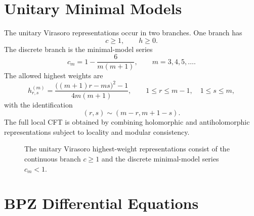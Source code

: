 \section{Unitary Minimal Models}

The unitary Virasoro representations occur in two branches.  One branch has
\[
  c\ge1,
  \qquad
  h\ge0.
\]
The discrete branch is the minimal-model series
\begin{equation}
  c_m=1-\frac{6}{m(m+1)},
  \qquad
  m=3,4,5,\ldots .
  \label{eq:unitary-minimal-central-charge}
\end{equation}
The allowed highest weights are
\begin{equation}
  h_{r,s}^{(m)}
  =
  \frac{\bigl((m+1)r-ms\bigr)^2-1}{4m(m+1)},
  \qquad
  1\le r\le m-1,
  \quad
  1\le s\le m,
  \label{eq:kac-weights-unitary-minimal}
\end{equation}
with the identification
\[
  (r,s)\sim(m-r,m+1-s).
\]
The full local CFT is obtained by combining holomorphic and antiholomorphic
representations subject to locality and modular consistency.

\begin{figure}[H]
  \centering
  \caption{The unitary Virasoro highest-weight representations consist of the
  continuous branch \(c\ge1\) and the discrete minimal-model series
  \(c_m<1\).}
  \label{fig:virasoro-unitarity-branches}
\end{figure}

\section{BPZ Differential Equations}

